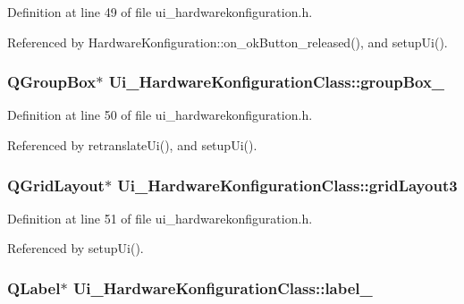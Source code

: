 Definition at line 49 of file ui\_\-hardwarekonfiguration.h.

Referenced by HardwareKonfiguration::on\_\-okButton\_\-released(), and setupUi().\hypertarget{class_ui___hardware_konfiguration_class_4d695d720fa8e0628352988ce0444032}{
\subsubsection[groupBox\_\-2]{\setlength{\rightskip}{0pt plus 5cm}QGroupBox$\ast$ {\bf Ui\_\-HardwareKonfigurationClass::groupBox\_}}}
\label{class_ui___hardware_konfiguration_class_4d695d720fa8e0628352988ce0444032}




Definition at line 50 of file ui\_\-hardwarekonfiguration.h.

Referenced by retranslateUi(), and setupUi().\hypertarget{class_ui___hardware_konfiguration_class_616060ede50422ca3ac6f840ddf04d92}{
\subsubsection[gridLayout3]{\setlength{\rightskip}{0pt plus 5cm}QGridLayout$\ast$ {\bf Ui\_\-HardwareKonfigurationClass::gridLayout3}}}
\label{class_ui___hardware_konfiguration_class_616060ede50422ca3ac6f840ddf04d92}




Definition at line 51 of file ui\_\-hardwarekonfiguration.h.

Referenced by setupUi().\hypertarget{class_ui___hardware_konfiguration_class_348aba125d7ff32a3150296a76abaf80}{
\subsubsection[label\_\-11]{\setlength{\rightskip}{0pt plus 5cm}QLabel$\ast$ {\bf Ui\_\-HardwareKonfigurationClass::label\_}}}
\label{class_ui___hardware_konfiguration_class_348aba125d7ff32a3150296a76abaf80}




